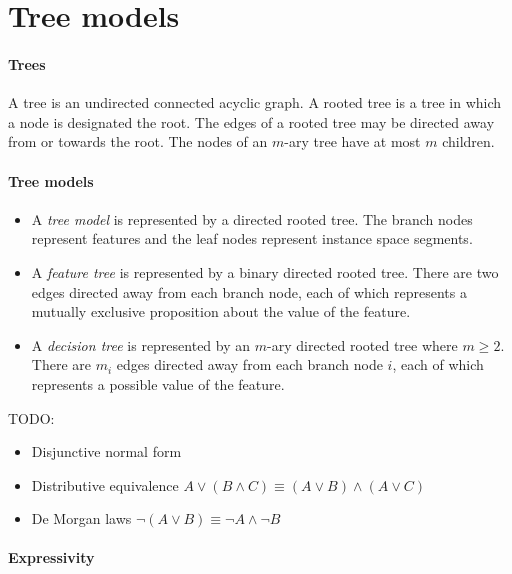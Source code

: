 \section{Tree models}

\paragraph{Trees}

A tree is an undirected connected acyclic graph.
A rooted tree is a tree in which a node is designated the root.
The edges of a rooted tree may be directed away from or towards the root.
The nodes of an $m$-ary tree have at most $m$ children.

\paragraph{Tree models}

\begin{itemize}
  \item A \textit{tree model} is represented by a directed rooted tree.
        The branch nodes represent features and the leaf nodes represent instance space
        segments.
  \item A \textit{feature tree} is represented by a binary directed rooted tree.
        There are two edges directed away from each branch node, each of which
        represents a mutually exclusive proposition about the value of the feature.
  \item A \textit{decision tree} is represented by an $m$-ary directed rooted tree where $m \geq 2$.
        There are $m_i$ edges directed away from each branch node $i$, each of which
        represents a possible value of the feature.
\end{itemize}

TODO:

\begin{itemize}
  \item Disjunctive normal form
  \item Distributive equivalence $A \vee (B \wedge C) \equiv (A \vee B) \wedge (A \vee C)$
  \item De Morgan laws $\neg (A \vee B) \equiv \neg A \wedge \neg B$
\end{itemize}

\paragraph{Expressivity}

